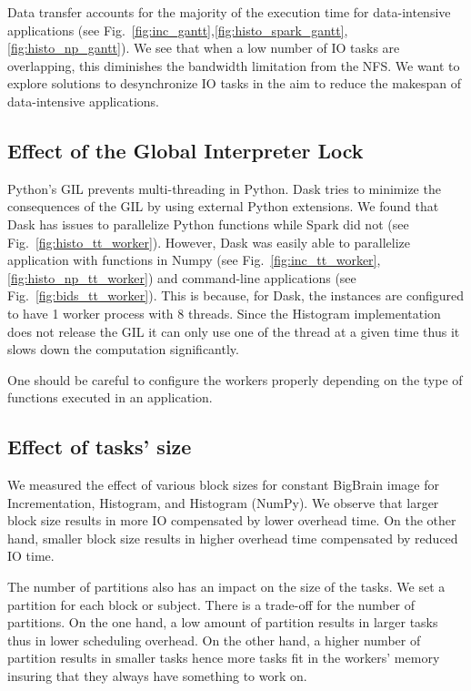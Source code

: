 \documentclass[conference]{IEEEtran}
\begin{document}
Data transfer accounts for the majority of the execution time for data-intensive
applications (see
Fig.~\ref{fig:inc_gantt},\ref{fig:histo_spark_gantt},\ref{fig:histo_np_gantt}). We
see that when a low number of IO tasks are overlapping, this diminishes the bandwidth
limitation from the NFS. We want to explore solutions to desynchronize IO tasks in
the aim to reduce the makespan of data-intensive applications.

\subsection{Effect of the Global Interpreter Lock}
Python's GIL prevents multi-threading in Python. Dask tries to minimize the
consequences of the GIL by using external Python extensions. We found that Dask has
issues to parallelize Python functions while Spark did not (see
Fig.~\ref{fig:histo_tt_worker}). However, Dask was easily able to parallelize
application with functions in Numpy (see
Fig.~\ref{fig:inc_tt_worker},\ref{fig:histo_np_tt_worker}) and command-line
applications (see Fig.~\ref{fig:bids_tt_worker}). This is because, for Dask, the
instances are configured to have 1 worker process with 8 threads. Since the Histogram
implementation does not release the GIL it can only use one of the thread at a given
time thus it slows down the computation significantly.

One should be careful to configure the workers properly depending on the type
of functions executed in an application.

\subsection{Effect of tasks' size}
We measured the effect of various block sizes for constant BigBrain image for
Incrementation, Histogram, and Histogram (NumPy). We observe that larger block size
results in more IO compensated by lower overhead time. On the other hand, smaller
block size results in higher overhead time compensated by reduced IO time.

The number of partitions also has an impact on the size of the tasks. We set a
partition for each block or subject. There is a trade-off for the number of
partitions. On the one hand, a low amount of partition results in larger tasks thus
in lower scheduling overhead. On the other hand, a higher number of partition
results in smaller tasks hence more tasks fit in the workers' memory insuring that
they always have something to work on.
\end{document}
